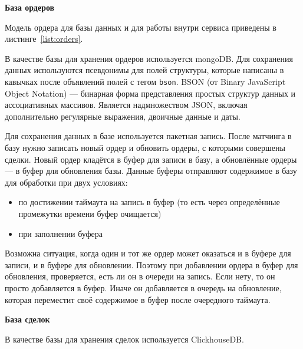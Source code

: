 \textbf{База ордеров}

Модель ордера для базы данных и для работы внутри сервиса приведены в листинге~\ref{list:orders}.



В качестве базы для хранения ордеров используется mongoDB. Для сохранения данных используются псевдонимы для полей структуры, которые написаны в кавычках после объявлений полей с тегом \lstinline{bson}. BSON (от Binary JavaScript Object Notation) — бинарная форма представления простых структур данных и ассоциативных массивов. Является надмножеством JSON, включая дополнительно регулярные выражения, двоичные данные и даты.

Для сохранения данных в базе используется пакетная запись.
После матчинга в базу нужно записать новый ордер и обновить ордеры, с которыми совершены сделки.
Новый ордер кладётся в буфер для записи в базу, а обновлённые ордеры — в буфер для обновления базы.
Данные буферы отправляют содержимое в базу для обработки при двух условиях:

\begin{itemize}
    \item по достижении таймаута на запись в буфер (то есть через определённые промежутки времени буфер очищается)
    \item при заполнении буфера
\end{itemize}

Возможна ситуация, когда один и тот же ордер может оказаться и в буфере для записи, и в буфере для обновлении.
Поэтому при добавлении ордера в буфер для обновления, проверяется, есть ли он в очереди на запись.
Если нету, то он просто добавляется в буфер.
Иначе он добавляется в очередь на обновление, которая переместит своё содержимое в буфер после очередного таймаута.

\textbf{База сделок}

В качестве базы для хранения сделок используется ClickhouseDB.

